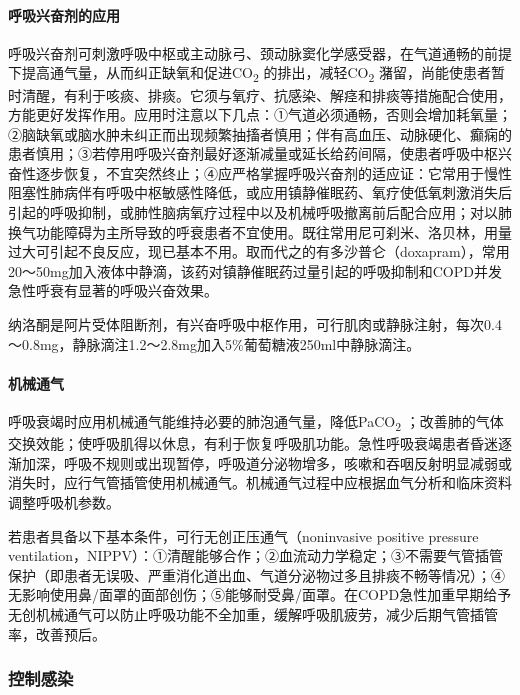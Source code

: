 \paragraph{呼吸兴奋剂的应用}

呼吸兴奋剂可刺激呼吸中枢或主动脉弓、颈动脉窦化学感受器，在气道通畅的前提下提高通气量，从而纠正缺氧和促进CO\textsubscript{2}
的排出，减轻CO\textsubscript{2}
潴留，尚能使患者暂时清醒，有利于咳痰、排痰。它须与氧疗、抗感染、解痉和排痰等措施配合使用，方能更好发挥作用。应用时注意以下几点：①气道必须通畅，否则会增加耗氧量；②脑缺氧或脑水肿未纠正而出现频繁抽搐者慎用；伴有高血压、动脉硬化、癫痫的患者慎用；③若停用呼吸兴奋剂最好逐渐减量或延长给药间隔，使患者呼吸中枢兴奋性逐步恢复，不宜突然终止；④应严格掌握呼吸兴奋剂的适应证：它常用于慢性阻塞性肺病伴有呼吸中枢敏感性降低，或应用镇静催眠药、氧疗使低氧刺激消失后引起的呼吸抑制，或肺性脑病氧疗过程中以及机械呼吸撤离前后配合应用；对以肺换气功能障碍为主所导致的呼衰患者不宜使用。既往常用尼可刹米、洛贝林，用量过大可引起不良反应，现已基本不用。取而代之的有多沙普仑（doxapram），常用20～50mg加入液体中静滴，该药对镇静催眠药过量引起的呼吸抑制和COPD并发急性呼衰有显著的呼吸兴奋效果。

纳洛酮是阿片受体阻断剂，有兴奋呼吸中枢作用，可行肌肉或静脉注射，每次0.4～0.8mg，静脉滴注1.2～2.8mg加入5\%葡萄糖液250ml中静脉滴注。

\paragraph{机械通气}

呼吸衰竭时应用机械通气能维持必要的肺泡通气量，降低PaCO\textsubscript{2}
；改善肺的气体交换效能；使呼吸肌得以休息，有利于恢复呼吸肌功能。急性呼吸衰竭患者昏迷逐渐加深，呼吸不规则或出现暂停，呼吸道分泌物增多，咳嗽和吞咽反射明显减弱或消失时，应行气管插管使用机械通气。机械通气过程中应根据血气分析和临床资料调整呼吸机参数。

若患者具备以下基本条件，可行无创正压通气（noninvasive positive pressure
ventilation，NIPPV）：①清醒能够合作；②血流动力学稳定；③不需要气管插管保护（即患者无误吸、严重消化道出血、气道分泌物过多且排痰不畅等情况）；④无影响使用鼻/面罩的面部创伤；⑤能够耐受鼻/面罩。在COPD急性加重早期给予无创机械通气可以防止呼吸功能不全加重，缓解呼吸肌疲劳，减少后期气管插管率，改善预后。

\subsubsection{控制感染}

